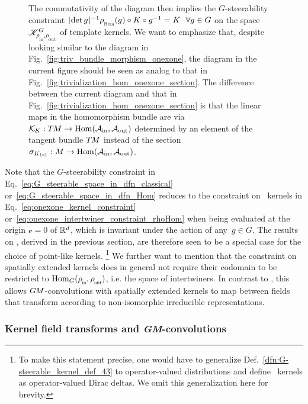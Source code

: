 \begin{figure}
{        The commutativity of the diagram then implies the $G$-steerability constraint ${\detg^{-1} \rhoHom(g) \circ K \circ g^{-1} = K} \ \ \forall g\in G$ on the space~$\KG$ of template kernels.
        We want to emphasize that, despite looking similar to the diagram in Fig.~\ref{fig:triv_bundle_morphism_onexone}, the diagram in the current figure should be seen as analog to that in Fig.~\ref{fig:trivialization_hom_onexone_section}.
        The difference between the current diagram and that in Fig.~\ref{fig:trivialization_hom_onexone_section} is that the linear maps in the homomorphism bundle are via $\mathcal{K}_{\mkern-2mu K}: T\mkern-1.5muM\to \operatorname{Hom}(\mathcal{A}_\textup{in},\mathcal{A}_\textup{out})$ determined by an element of the tangent bundle $T\mkern-1.5muM$ instead of the section $\sigma_{K_{1\!\times\!1}}: M\to \operatorname{Hom}(\mathcal{A}_\textup{in},\mathcal{A}_\textup{out})$.
    }
    \label{fig:triv_kernel_bundle_morphism}
\end{figure}


Note that the $G$-steerability constraint in Eq.~\eqref{eq:G_steerable_space_in_dfn_classical} or~\eqref{eq:G_steerable_space_in_dfn_Hom} reduces to the constraint on \onexoneGM\ kernels in Eq.~\eqref{eq:onexone_kernel_constraint} or~\eqref{eq:onexone_intertwiner_constraint_rhoHom} when being evaluated at the origin $\mathscr{v}=0$ of $\mathbb{R}^d$, which is invariant under the action of any~$g\in G$.
The results on \onexoneGMs, derived in the previous section, are therefore seen to be a special case for the choice of point-like kernels.%
\footnote{
    To make this statement precise, one would have to generalize Def.~\ref{dfn:G-steerable_kernel_def_43} to operator-valued distributions and define \onexoneGM\ kernels as operator-valued Dirac deltas.
    We omit this generalization here for brevity.
}
We further want to mention that the constraint on spatially extended kernels does in general not require their codomain to be restricted to $\Hom_G(\rhoin,\rhoout)$, i.e. the space of intertwiners.
In contrast to \onexoneGMs, this allows $G\mkern-1.4muM$-convolutions with spatially extended kernels to map between fields that transform according to non-isomorphic irreducible representations.










\subsubsection{Kernel field transforms and \textit{GM}-convolutions}
\label{sec:KFTs_GM-conv_global}

